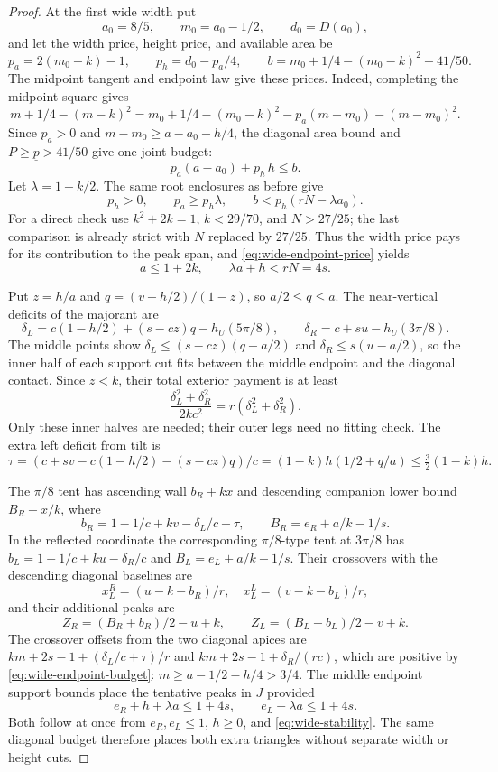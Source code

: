 \begin{proof}
At the first wide width put
\[
 a_0=8/5,\qquad m_0=a_0-1/2,\qquad d_0=D(a_0),
\]
and let the width price, height price, and available area be
\[
 p_a=2(m_0-k)-1,\qquad p_h=d_0-p_a/4,\qquad
 b=m_0+1/4-(m_0-k)^2-41/50.
\]
The midpoint tangent and endpoint law give these prices.
Indeed, completing the midpoint square gives
\[
 m+1/4-(m-k)^2
 =m_0+1/4-(m_0-k)^2-p_a(m-m_0)-(m-m_0)^2.
\]
Since $p_a>0$ and $m-m_0\ge a-a_0-h/4$, the diagonal area bound and
$P\ge\underline p>41/50$ give one joint budget:
\begin{equation}\label{eq:wide-endpoint-price}
 p_a(a-a_0)+p_h\,h\le b.
\end{equation}
Let $\lambda=1-k/2$. The same root enclosures as before give
\[
 p_h>0,\qquad p_a\ge p_h\lambda,\qquad
 b<p_h(rN-\lambda a_0).
\]
For a direct check use $k^2+2k=1$, $k<29/70$, and $N>27/25$;
the last comparison is already strict with $N$ replaced by $27/25$.
Thus the width price pays for its contribution to the peak span, and
\cref{eq:wide-endpoint-price} yields
\begin{equation}\label{eq:wide-stability}
 a\le1+2k,\qquad \lambda a+h<rN=4s.
\end{equation}

Put $z=h/a$ and $q=(v+h/2)/(1-z)$, so $a/2\le q\le a$.
The near-vertical deficits of the majorant are
\[
 \delta_L=c(1-h/2)+(s-cz)q-h_U(5\pi/8),\qquad
 \delta_R=c+su-h_U(3\pi/8).
\]
The middle points show $\delta_L\le(s-cz)(q-a/2)$ and
$\delta_R\le s(u-a/2)$, so the inner half of each support cut fits between the middle endpoint
and the diagonal contact. Since $z<k$, their total exterior payment is
at least
\[
 \frac{\delta_L^2+\delta_R^2}{2kc^2}
 =r(\delta_L^2+\delta_R^2).
\]
Only these inner halves are needed; their outer legs need no fitting check.
The extra left deficit from tilt is
\[
 \tau=(c+sv-c(1-h/2)-(s-cz)q)/c
      =(1-k)h(1/2+q/a)\le\tfrac32(1-k)h.
\]

The $\pi/8$ tent has ascending wall
$b_R+kx$ and descending companion lower bound $B_R-x/k$, where
\[
 b_R=1-1/c+kv-\delta_L/c-\tau,\qquad
 B_R=e_R+a/k-1/s.
\]
In the reflected coordinate the corresponding $\pi/8$-type tent
at $3\pi/8$ has
$b_L=1-1/c+ku-\delta_R/c$ and $B_L=e_L+a/k-1/s$.
Their crossovers with the descending diagonal baselines are
\[
 x_L^R=(u-k-b_R)/r,\quad x_L^L=(v-k-b_L)/r,
\]
and their additional peaks are
\[
 Z_R=(B_R+b_R)/2-u+k,\qquad
 Z_L=(B_L+b_L)/2-v+k.
\]
The crossover offsets from the two diagonal apices are
$km+2s-1+(\delta_L/c+\tau)/r$ and
$km+2s-1+\delta_R/(rc)$, which are positive by
\cref{eq:wide-endpoint-budget}: $m\ge a-1/2-h/4>3/4$.
The middle endpoint support bounds place the tentative peaks in $J$
provided
\[
 e_R+h+\lambda a\le1+4s,\qquad
 e_L+\lambda a\le1+4s.
\]
Both follow at once from $e_R,e_L\le1$, $h\ge0$, and
\cref{eq:wide-stability}. The same diagonal budget therefore places
both extra triangles without separate width or height cuts.


\end{proof}
